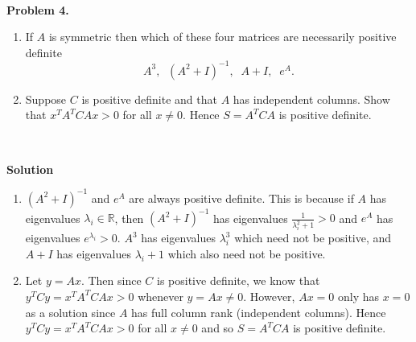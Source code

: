 \documentclass[11pt]{article}
\begin{document}
\

\noindent \textbf{Problem 4.}\\
\begin{enumerate}
\item If $A$ is symmetric then which of these four matrices are necessarily positive definite
$$A^3, \;\; (A^2+I)^{-1}, \;\; A+I, \;\; e^A.$$
\item Suppose $C$ is positive definite and that $A$ has independent columns. Show that $x^TA^TCAx > 0$ for all $x\neq 0$. Hence $S = A^TCA$ is positive definite. 
\end{enumerate}

\

\noindent \textbf{Solution}\\
\begin{enumerate}
\item $(A^2+I)^{-1}$ and $e^A$ are always positive definite. This is because if $A$ has eigenvalues $\lambda_i\in\mathbb{R}$, then $(A^2+I)^{-1}$ has eigenvalues $\frac{1}{\lambda_i^2+1}>0$ and $e^A$ has eigenvalues $e^{\lambda_i}>0$. $A^3$ has eigenvalues $\lambda_i^3$ which need not be positive, and $A+I$ has eigenvalues $\lambda_i+1$ which also need not be positive. 
\item Let $y = Ax$. Then since $C$ is positive definite, we know that $y^T C y = x^TA^TCAx > 0$ whenever $y=Ax \neq 0$. However, $Ax = 0$ only has $x=0$ as a solution since $A$ has full column rank (independent columns). Hence $y^T C y = x^TA^TCAx > 0$ for all $x\neq 0$ and so  $S = A^TCA$ is positive definite. 
\end{enumerate}
\end{document}
